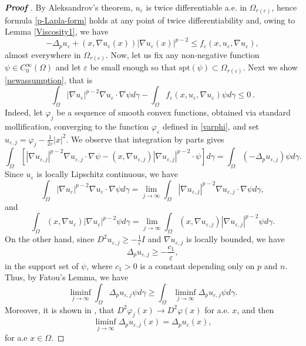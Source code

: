 \documentclass[12pt]{amsart}
\newcommand{\1}{\mathbf 1}
\begin{document}
\begin{proof}[\bf Proof ]
By Aleksandrov's theorem, $u_\varepsilon$ is twice differentiable a.e. in $\Omega_{r(\varepsilon)}$, hence formula \eqref{p-Lapla-form} holds at any point of twice differentiability and, owing to Lemma \ref{Viscosity1}, we have
\begin{equation}\label{4-9-1}
-\Delta_p u_\varepsilon +(x,\nabla u_\varepsilon(x))|\nabla u_\varepsilon(x)|^{p-2}\leq f_\varepsilon(x,u_\varepsilon,\nabla u_\varepsilon),
\end{equation}
almost everywhere in $\Omega_{r(\varepsilon)}$.
Now, let us fix any non-negative function $\psi \in C^{\infty}_0(\Omega)$ and let $\varepsilon$ be small enough so that $\text{spt}(\psi)\subset\Omega_{r(\varepsilon)}$. Next we show {  \eqref{newassumption}, that is}
\begin{equation}\label{4-10}
\int_{\Omega} |\nabla u_\varepsilon|^{p-2} \nabla {u_\varepsilon} \cdot \nabla\psi d\gamma-\int_{\Omega}f_\varepsilon(x,u_\varepsilon,\nabla u_\varepsilon) \psi d\gamma \leq 0\,.
\end{equation}
Indeed, let $\varphi_j$ be a sequence of smooth convex functions, obtained via standard mollification, converging to the function $\varphi_\varepsilon$ defined in \eqref{varphi}, and set $u_{\varepsilon,j}=\varphi_j-\frac{1}{2\varepsilon}|x|^2$. We observe that integration by parts gives
\[
\int_{\Omega} \left[|\nabla u_{\varepsilon,j}|^{p-2} \nabla u_{\varepsilon,j} \cdot \nabla\psi -(x,\nabla u_{\varepsilon,j})|\nabla u_{\varepsilon,j}|^{p-2} \cdot \psi\right] d\gamma=\int_\Omega (-\Delta_p u_{\varepsilon,j})\psi d\gamma.
\]
Since $u_\varepsilon$ is locally Lipschitz continuous, we have
\[
\int_\Omega |\nabla u_\varepsilon|^{p-2} \nabla u_\varepsilon \cdot \nabla \psi d\gamma = \mathop{\lim}_{j\rightarrow \infty} \int_\Omega |\nabla u_{\varepsilon,j}|^{p-2} \nabla u_{\varepsilon,j} \cdot \nabla\psi d\gamma,
\]
and
\[
\int_{\Omega} (x,\nabla u_\varepsilon)|\nabla u_\varepsilon|^{p-2}\psi d\gamma = \mathop{\lim}_{j\rightarrow \infty} \int_{\Omega} (x,\nabla u_{\varepsilon,j})|\nabla u_{\varepsilon,j}|^{p-2}\psi d\gamma.
\]
On the other hand, since $D^2 u_{\varepsilon,j}\geq- \frac{1}{\varepsilon} I$ and $\nabla u_{\varepsilon,j}$ is locally bounded, we have
\[
\Delta_p u_{\varepsilon,j} \geq -\frac{c_1}{\varepsilon},
\]
in the support set of $\psi$, where $c_1>0$ is a constant depending only on $p$ and $n$. Thus, by Fatou's Lemma, we have
\[
\mathop{\lim \inf}_{j\rightarrow \infty} \int_\Omega\Delta_p u_{\varepsilon,j} \psi d\gamma \geq  \int_\Omega \mathop{\lim \inf}_{j\rightarrow \infty}\Delta_p u_{\varepsilon,j} \psi d\gamma.
\]
Moreover, it is shown in \cite[p.242]{Evans1992}, that $D^2\varphi_j(x)\rightarrow D^2\varphi(x)$ for a.e. $x$, and then
\[
\mathop{\lim \inf }_{j\rightarrow \infty} \Delta_p u_{\varepsilon,j} (x)=\Delta_p u_\varepsilon (x),
\]
for a.e $x\in \Omega$.


\end{proof}
\end{document}
